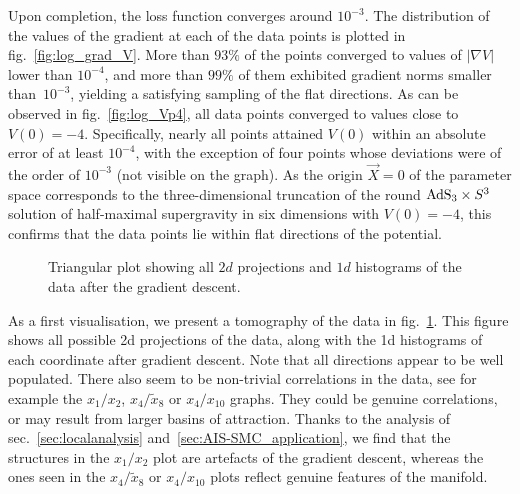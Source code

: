\documentclass[11pt,a4paper]{article}
\begin{document}
	Upon completion, the loss function converges around $10^{-3}$. The distribution of the values of the gradient at each of the data points is plotted in fig.~\ref{fig:log_grad_V}. More than $93\%$ of the points converged to values of $\vert\nabla V\vert$ lower than $10^{-4}$, and more than $99\%$ of them exhibited gradient norms smaller than~$10^{-3}$, yielding a satisfying sampling of the flat directions. As can be observed in fig.~\ref{fig:log_Vp4}, all data points converged to values close to $V(0)=-4$. Specifically, nearly all points attained $V(0)$ within an absolute error of at least $10^{-4}$, with the exception of four points whose deviations were of the order of $10^{-3}$ (not visible on the graph). As the origin $\vec{X}=0$ of the parameter space corresponds to the three-dimensional truncation of the round ${\rm AdS}_{3}\times S^{3}$ solution of half-maximal supergravity in six dimensions with $V(0)=-4$, this confirms that the data points lie within flat directions of the potential.

	\begin{figure}[!b]
		\centering
		\caption{Triangular plot showing all $2d$ projections and $1d$ histograms of the data after the gradient descent.}
		\label{triangular_plot_1_2_4_8_10}
	\end{figure}
	
	As a first visualisation, we present a tomography of the data in fig.~\ref{triangular_plot_1_2_4_8_10}. This figure shows all possible 2d projections of the data, along with the 1d histograms of each coordinate after gradient descent. Note that all directions appear to be well populated. There also seem to be non-trivial correlations in the data, see for example the $x_1/x_2$, $x_4/\tilde{x}_8$ or $x_4/x_{10}$ graphs. They could be genuine correlations, or may result from larger basins of attraction. Thanks to the analysis of sec.~\ref{sec:localanalysis} and~\ref{sec:AIS-SMC_application}, we find that the structures in the $x_1/x_2$ plot are artefacts of the gradient descent, whereas the ones seen in the $x_4/\tilde{x}_8$ or $x_4/x_{10}$ plots reflect genuine features of the manifold. 
\end{document}
